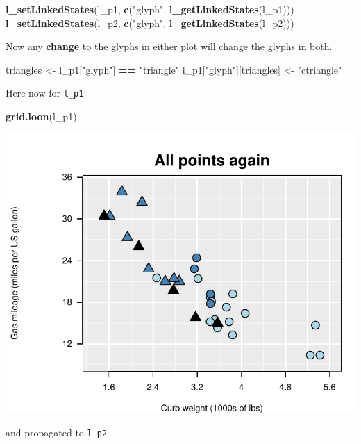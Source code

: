\documentclass[]{article}
\newenvironment{Shaded}{\begin{snugshade}}{\end{snugshade}}
\newcommand{\KeywordTok}[1]{\textcolor[rgb]{0.13,0.29,0.53}{\textbf{#1}}}
\newcommand{\StringTok}[1]{\textcolor[rgb]{0.31,0.60,0.02}{#1}}
\newcommand{\OperatorTok}[1]{\textcolor[rgb]{0.81,0.36,0.00}{\textbf{#1}}}
\newcommand{\NormalTok}[1]{#1}
\begin{document}
\begin{Shaded}
\begin{Highlighting}[]
\KeywordTok{l_setLinkedStates}\NormalTok{(l_p1, }\KeywordTok{c}\NormalTok{(}\StringTok{"glyph"}\NormalTok{, }\KeywordTok{l_getLinkedStates}\NormalTok{(l_p1)))}
\KeywordTok{l_setLinkedStates}\NormalTok{(l_p2, }\KeywordTok{c}\NormalTok{(}\StringTok{"glyph"}\NormalTok{, }\KeywordTok{l_getLinkedStates}\NormalTok{(l_p2)))}
\end{Highlighting}
\end{Shaded}

Now any \textbf{change} to the glyphs in either plot will change the
glyphs in both.

\begin{Shaded}
\begin{Highlighting}[]
\NormalTok{triangles <-}\StringTok{ }\NormalTok{l_p1[}\StringTok{"glyph"}\NormalTok{] }\OperatorTok{==}\StringTok{ "triangle"}
\NormalTok{l_p1[}\StringTok{"glyph"}\NormalTok{][triangles] <-}\StringTok{ "ctriangle"}
\end{Highlighting}
\end{Shaded}

Here now for \texttt{l\_p1}

\begin{Shaded}
\begin{Highlighting}[]
\KeywordTok{grid.loon}\NormalTok{(l_p1)}
\end{Highlighting}
\end{Shaded}

\begin{center}\includegraphics[width=0.7\linewidth]{ggplots2loon_files/figure-latex/changed glyphs l_p1-1} \end{center}

and propagated to \texttt{l\_p2}
\end{document}
